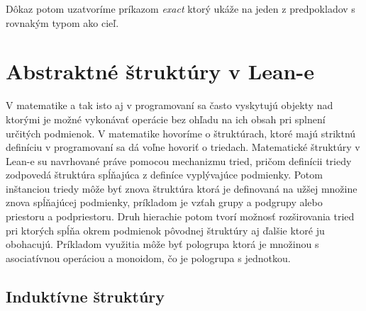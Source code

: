 \documentclass[a4paper,10pt,oneside]{report}%
\begin{document}
Dôkaz potom uzatvoríme príkazom \emph{exact} ktorý ukáže na jeden z predpokladov
    s rovnakým typom ako cieľ.

\section{Abstraktné štruktúry v Lean-e}
    V matematike a tak isto aj v programovaní sa často vyskytujú objekty
nad ktorými je možné vykonávať operácie bez ohľadu na ich obsah pri splnení
určitých podmienok.
    V matematike hovoríme o štruktúrach, ktoré majú striktnú definíciu v programovaní
sa dá voľne hovoriť o triedach.
    Matematické štruktúry v Lean-e su navrhované práve pomocou mechanizmu tried,
pričom definícii triedy zodpovedá štruktúra spĺňajúca z definíce vyplývajúce podmienky.
    Potom inštanciou triedy môže byť znova štruktúra ktorá je definovaná na užšej množine
znova spĺňajúcej podmienky, príkladom je vzťah grupy a podgrupy alebo
priestoru a podpriestoru.
    Druh hierachie potom tvorí možnosť rozširovania tried pri ktorých spĺňa okrem
podmienok pôvodnej štruktúry aj ďalšie ktoré ju obohacujú.
    Príkladom využitia môže byť pologrupa ktorá je množinou s asociatívnou operáciou
a monoidom, čo je pologrupa s jednotkou.
\subsection{Induktívne štruktúry}
\end{document}
